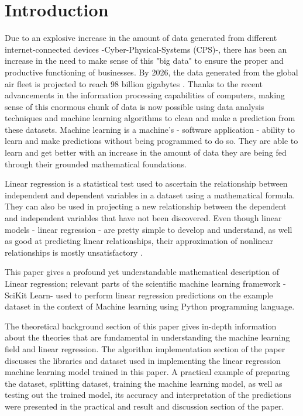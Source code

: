 \documentclass[conference]{IEEEtran}
\begin{document}
\section{Introduction}
Due to an explosive increase in the amount of data generated from different internet-connected devices -Cyber-Physical-Systems (CPS)-, there has been an increase in the need to make sense of this "big data" to ensure the proper and productive functioning of businesses. By 2026, the data generated from the global air fleet is projected to reach 98 billion gigabytes \cite{oliver_wyman}. Thanks to the recent advancements in the information processing capabilities of computers, making sense of this enormous chunk of data is now possible using data analysis techniques and machine learning algorithms to clean and make a prediction from these datasets. Machine learning is a machine's - software application - ability to learn and make predictions without being programmed to do so. They are able to learn and get better with an increase in the amount of data they are being fed through their grounded mathematical foundations.

\quad Linear regression is a statistical test used to ascertain the relationship between independent and dependent variables in a dataset using a mathematical formula. They can also be used in projecting a new relationship between the dependent and independent variables that have not been discovered.
Even though linear models - linear regression - are pretty simple to develop and understand, as well as good at predicting linear relationships, their approximation of nonlinear relationships is mostly unsatisfactory \cite{article_lee}. 

\quad This paper gives a profound yet understandable mathematical description of Linear regression; relevant parts of the scientific machine learning framework -SciKit Learn- used to perform linear regression predictions on the example dataset in the context of Machine learning using Python programming language. 

\quad The theoretical background section of this paper gives in-depth information about the theories that are fundamental in understanding the machine learning field and linear regression. The algorithm implementation section of the paper discusses the libraries and dataset used in implementing the linear regression machine learning model trained in this paper. A practical example of preparing the dataset, splitting dataset, training the machine learning model, as well as testing out the trained model, its accuracy and interpretation of the predictions were presented in the practical and result and discussion section of the paper.
\end{document}
